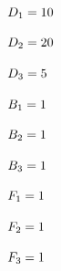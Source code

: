 \documentclass[fleqn]{article}
\begin{document}
\begin{enumerate}
    $
      D_1=10
      \\
      \\
    $

    $
      D_2=20
      \\
      \\
    $

    $
      D_3=5
      \\
      \\
    $

    $
      B_1=1
      \\
      \\
    $

    $
      B_2=1
      \\
      \\
    $

    $
      B_3=1
      \\
      \\
    $

    $
      F_1=1
      \\
      \\
    $

    $
      F_2=1
      \\
      \\
    $

    $
      F_3=1
      \\
      \\
    $
    
  \end{enumerate}
\end{document}
